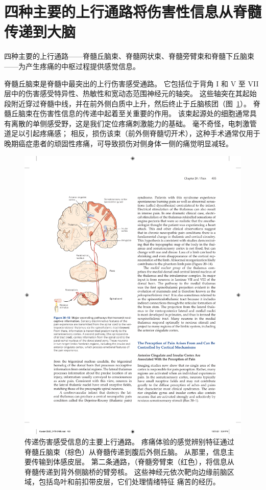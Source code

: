 \section{四种主要的上行通路将伤害性信息从脊髓传递到大脑}

四种主要的上行通路——脊髓丘脑束、脊髓网状束、脊髓旁臂束和脊髓下丘脑束——为产生疼痛的中枢过程提供感觉信息。


脊髓丘脑束是脊髓中最突出的上行伤害感受通路。
它包括位于背角 I 和 V 至 VII 层中的伤害感受特异性、热敏性和宽动态范围神经元的轴突。
这些轴突在其起始段附近穿过脊髓中线，并在前外侧白质中上升，然后终止于丘脑核团（图~\ref{fig:20_13}）。
脊髓丘脑束在伤害性信息的传递中起着至关重要的作用。 
该束起源处的细胞通常具有离散的单侧感受野，这是我们定位疼痛刺激能力的基础。
毫不奇怪，电刺激管道足以引起疼痛感；
相反，损伤该束（前外侧脊髓切开术），这种手术通常仅用于晚期癌症患者的顽固性疼痛，可导致损伤对侧身体一侧的痛觉明显减轻。


\begin{figure}[htbp]
	\centering
	\includegraphics[width=0.7\linewidth]{chap20/fig_20_13}
	\caption{传递伤害感受信息的主要上行通路。
		疼痛体验的感觉辨别特征通过脊髓丘脑束（棕色）从脊髓传递到腹后外侧丘脑。
		从那里，信息主要传输到体感皮层。
		第二条通路，（脊髓旁臂束（红色），将信息从脊髓传递到背外侧脑桥的臂旁核。
		这些神经元依次靶向边缘前脑区域，包括岛叶和前扣带皮层，它们处理情绪特征 痛苦的经历。}
	\label{fig:20_13}
\end{figure}


